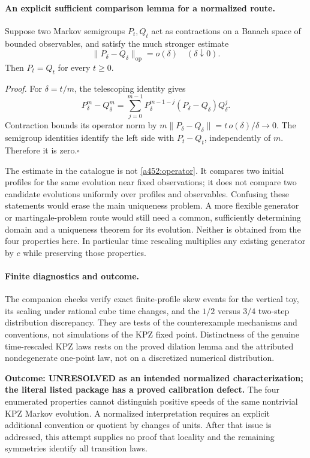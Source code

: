 \documentclass[11pt]{article}
\begin{document}
\paragraph{An explicit sufficient comparison lemma for a normalized route.}
Suppose two Markov semigroups $P_t,Q_t$ act as contractions on a Banach
space of bounded observables, and satisfy the much stronger estimate
\begin{equation}\label{a452:operator}
 \|P_\delta-Q_\delta\|_{\mathrm{op}}=o(\delta)
 \quad(\delta\downarrow0).
\end{equation}
Then $P_t=Q_t$ for every $t\ge0$.

\emph{Proof.} For $\delta=t/m$, the telescoping identity gives
\[
 P_\delta^m-Q_\delta^m
 =\sum_{j=0}^{m-1}P_\delta^{m-1-j}
                  (P_\delta-Q_\delta)Q_\delta^j.
\]
Contraction bounds its operator norm by
$m\|P_\delta-Q_\delta\|=t\,o(\delta)/\delta\to0$.
The semigroup identities identify the left side with $P_t-Q_t$,
independently of $m$. Therefore it is zero.\hfill$\square$

The estimate in the catalogue is not \eqref{a452:operator}. It compares
two initial profiles for the same evolution near fixed observations;
it does not compare two candidate evolutions uniformly over profiles and
observables. Confusing these statements would erase the main uniqueness
problem. A more flexible generator or martingale-problem route would
still need a common, sufficiently determining domain and a uniqueness
theorem for its evolution. Neither is obtained from the four properties
here. In particular time rescaling multiplies any existing generator by
$c$ while preserving those properties.

\paragraph{Finite diagnostics and outcome.}
The companion checks verify exact finite-profile skew events for the
vertical toy, its scaling under rational cube time changes, and the
$1/2$ versus $3/4$ two-step distribution discrepancy. They are tests of
the counterexample mechanisms and conventions, not simulations of the
KPZ fixed point. Distinctness of the genuine time-rescaled KPZ laws
rests on the proved dilation lemma and the attributed nondegenerate
one-point law, not on a discretized numerical distribution.

\textbf{Outcome: UNRESOLVED as an intended normalized characterization;
the literal listed package has a proved calibration defect.}
The four enumerated properties cannot distinguish positive speeds of the
same nontrivial KPZ Markov evolution. A normalized interpretation requires
an explicit additional convention or quotient by changes of units.
After that issue is addressed, this attempt supplies no proof that
locality and the remaining symmetries identify all transition laws.
\end{document}

